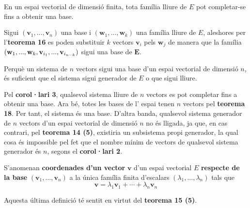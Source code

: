 \begin{corollari}
En un espai vectorial de dimensió finita, tota família lliure de $%
E$ pot completar-se fins a obtenir una base.

\end{corollari}
\begin{prova}
Sigui $(\mathbf{v}_{1},...,\mathbf{v}_{n})$ una base i $\left( \mathbf{w}%
_{1},...,\mathbf{w}_{k}\right) $ una família lliure de $E$, aleshores
per l’\textbf{teorema 16} es poden substituir $k$ vectors $\mathbf{v}_{i}$
pels $\mathbf{w}_{j}$ de manera que la família $(\mathbf{w}_{1},...,\mathbf{%
w}_{k},\mathbf{v}_{i_{1}},...,\mathbf{v}_{i_{n-k}})$ sigui una base de $%
\mathbf{E}$.
\end{prova}

\begin{corollari}
Perquè un sistema de $n$ vectors sigui una base d’un espai vectorial de
dimensió $n$, és suficient que el sistema sigui generador de $E$
o que sigui lliure.

\end{corollari}
\begin{prova}
Pel \textbf{corol·lari 3}, qualsevol sistema lliure de $n$ vectors es
pot completar fins a obtenir una base. Ara bé, totes les bases de l'
espai tenen $n$ vectors pel \textbf{teorema 18}. Per tant, el
sistema és una base. D'altra banda, qualsevol sistema generador de $n$
vectors d’un espai vectorial de dimensió $n$ no és lligada, ja que, en
cas contrari, pel \textbf{teorema 14 (5)}, existiria un subsistema
propi generador, la qual cosa és impossible pel fet que el nombre mínim de vectors de qualsevol sistema generador és $n$, segons el 
\textbf{corol·lari 2}.
\end{prova}

\begin{definicio}
S’anomenan \textbf{coordenades d’un vector} $\mathbf{v}$ d’un espai
vectorial $E$ \textbf{respecte de la base} $(\mathbf{v}_{1},...,%
\mathbf{v}_{n})$ a la única família finita d'escalars $(\lambda
_{1},...,\lambda _{n})$ tals que%
\begin{equation*}
\mathbf{v}=\lambda _{1}\mathbf{v}_{1}+\cdots +\lambda _{n}\mathbf{v}_{n}
\end{equation*}
\end{definicio}

\begin{observacio}
Aquesta última definició té sentit en virtut del \textbf{teorema
15 (5)}.
\end{observacio}

